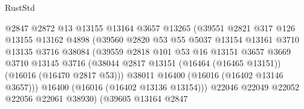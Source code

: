 \begin{lexlean}{RustStd}
\begin{coremodule}
                                    @2847
                                    @2872
                                    @13
                                    @13155
                                    @13164
                                    @3657
                                    @13265
                                    (@39551
                                      @2821
                                      @317
                                      @126
                                      @13155
                                      @13162
                                      @4898
                                      (@39560
                                        @2820
                                        @53
                                        @55
                                        @5037
                                        @13154
                                        @13161
                                        @3710
                                        @13135
                                        @3716
                                        @38084
                                        (@39559
                                          @2818
                                          @101
                                          @53
                                          @16
                                          @13151
                                          @3657
                                          @3669
                                          @3710
                                          @13145
                                          @3716
                                          (@38044
                                            @2817
                                            @13151
                                            (@16464 (@16465 @13151))
                                            (@16016 (@16470 @2817 @53)))
                                          @38011
                                          @16400
                                          (@16016 (@16402 @13146 @3657)))
                                        @16400
                                        (@16016 (@16402 @13136 @13154)))
                                      @22046
                                      @22049
                                      @22052
                                      @22056
                                      @22061
                                      @38930)
                                    (@39605
                                      @13164
                                      @2847

\end{coremodule}
\end{lexlean}

